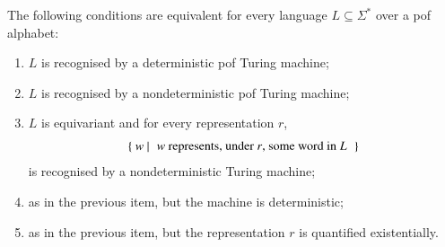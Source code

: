 \begin{theorem}\label{thm:pof-turing}
    The following conditions are equivalent for every language $L \subseteq \Sigma^*$ over a pof alphabet:
    \begin{enumerate}
        \item \label{item:turing-pof-det-pof} $L$ is recognised by a deterministic pof  Turing machine;
        \item \label{item:turing-pof-nondet-pof} $L$ is recognised by a nondeterministic pof  Turing machine;
        \item \label{item:turing-pof-every-rep} $L$ is equivariant and for every representation $r$, 
        \begin{align*}
            \setbuild{ w }{ $w$ represents, under $r$, some word in $L$}
            \end{align*}
         is recognised by  a nondeterministic  Turing machine;
        \item \label{item:turing-pof-every-rep-det} as in the previous item, but the machine is deterministic;
        \item \label{item:turing-pof-some-rep} as in the previous item, but the representation $r$ is quantified existentially.
    \end{enumerate}
\end{theorem}
